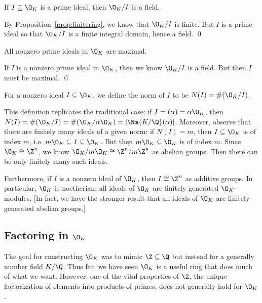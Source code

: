 \begin{cor}
If $I \subseteq \O_K$ is a prime ideal, then $\O_K/I$ is a field.
\end{cor}

\pf By Proposition~\ref{prop:finitering}, we know that $\O_K/I$ is finite. But $I$ is a prime ideal so that $\O_K/I$ is a finite integral domain, hence a field. \qed \\

\begin{prop}
All nonzero prime ideals in $\O_K$ are maximal. 
\end{prop}

\pf If $I$ is a nonzero prime ideal in $\O_K$, then we know $\O_K/I$ is a field. But then $I$ must be maximal. \qed \\

\begin{dfn}
For a nonzero ideal $I \subseteq \O_K$, we define the norm of $I$ to be $N(I)=\#(\O_K/I)$. 
\end{dfn}

This definition replicates the traditional case: if $I=(\alpha)=\alpha \O_K$, then $N(I)=\#(\O_K/I)=\#(\O_K/\alpha \O_K)=|\Nm{K/\Q}(\alpha)|$. Moreover, observe that there are finitely many ideals of a given norm: if $N(I)=m$, then $I \subseteq \O_K$ is of index $m$, i.e. $m \O_K \subseteq I \subseteq \O_K$. But then $m\O_K \subseteq \O_K$ is of index $m$. Since $\O_K \cong \Z^n$, we know $\O_K/m\O_K \cong \Z^n/m\Z^n$ as abelian groups. Then there can be only finitely many such ideals. 

Furthermore, if $I$ is a nonzero ideal of $\O_K$, then $I \cong \Z^n$ as additive groups. In particular, $\O_K$ is noetherian: all ideals of $\O_K$ are finitely generated $\O_K$-modules. [In fact, we have the stronger result that all ideals of $\O_K$ are finitely generated abelian groups.]



\subsection{Factoring in $\O_K$}

The goal for constructing $\O_K$ was to mimic $\Z \subseteq \Q$ but instead for a generally number field $K/\Q$. Thus far, we have seen $\O_K$ is a useful ring that does much of what we want. However, one of the vital properties of $\Z$, the unique factorization of elements into products of primes, does not generally hold for $\O_K$.

